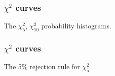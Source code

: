 \documentclass[handout]{beamer}
\begin{document}


   \begin{frame}
   \frametitle{$\chi^2$ curves}
   \begin{center}
   \end{center}
   The $\chi^2_5$, $\chi^2_{10}$ probability histograms.
   \end{frame}



   \begin{frame}
   \frametitle{$\chi^2$ curves}
   \begin{center}
   \end{center}
   The 5\% rejection rule for $\chi^2_5$
   \end{frame}

\end{document}
